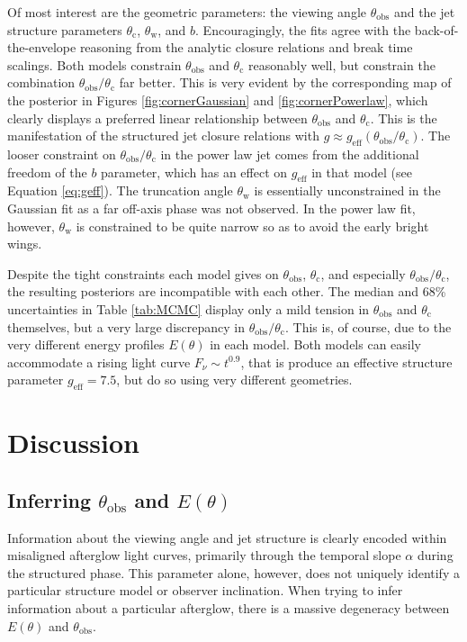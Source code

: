 \documentclass[twocolumn]{aastex62}
\newcommand{\thobs}{\ensuremath{\theta_{\mathrm{obs}}}}
\newcommand{\thW}{\ensuremath{\theta_{\mathrm{w}}}}
\newcommand{\thC}{\ensuremath{\theta_{\mathrm{c}}}}
\newcommand{\geff}{\ensuremath{g_{\mathrm{eff}}}}
\begin{document}
Of most interest are the geometric parameters: the viewing angle $\thobs$ and the jet structure parameters $\thC$, $\thW$, and $b$.  Encouragingly, the fits agree with the back-of-the-envelope reasoning from the analytic closure relations and break time scalings.  Both models constrain $\thobs$ and $\thC$ reasonably well, but constrain the combination $\thobs/\thC$ far better.  This is very evident by the corresponding map of the posterior in Figures \ref{fig:cornerGaussian} and \ref{fig:cornerPowerlaw}, which clearly displays a preferred linear relationship between $\thobs$ and $\thC$.  This is the manifestation of the structured jet closure relations with $g \approx \geff(\thobs/\thC)$.  The looser constraint on $\thobs/\thC$ in the power law jet comes from the additional freedom of the $b$ parameter, which has an effect on $\geff$ in that model (see Equation \eqref{eq:geff}). The truncation angle $\thW$ is essentially unconstrained in the Gaussian fit as a far off-axis phase was not observed.  In the power law fit, however, $\thW$ is constrained to be quite narrow so as to avoid the early bright wings.

Despite the tight constraints each model gives on $\thobs$, $\thC$, and especially $\thobs/\thC$, the resulting posteriors are incompatible with each other.  The median and 68\% uncertainties in Table \ref{tab:MCMC} display only a mild tension in $\thobs$  and $\thC$ themselves, but a very large discrepancy in $\thobs/\thC$.  This is, of course, due to the very different energy profiles $E(\theta)$ in each model.  Both models can easily accommodate a rising light curve $F_\nu \sim t^{0.9}$, that is produce an effective structure parameter $\geff = 7.5$, but do so using very different geometries.  


%
%

\section{Discussion}\label{sec:discussion}

\subsection{Inferring $\thobs$ and $E(\theta)$}

Information about the viewing angle and jet structure is clearly encoded within misaligned afterglow light curves, primarily through the temporal slope $\alpha$ during the structured phase.   This parameter alone, however, does not uniquely identify a particular structure model or observer inclination.  When trying to infer information about a particular afterglow, there is a massive degeneracy between $E(\theta)$ and $\thobs$.  
\end{document}
